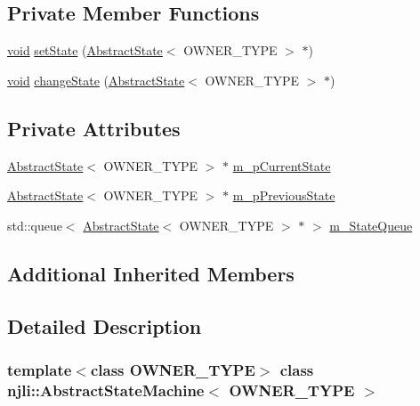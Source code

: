 \subsection*{Private Member Functions}
\begin{DoxyCompactItemize}
\item 
\mbox{\hyperlink{_thread_8h_af1e856da2e658414cb2456cb6f7ebc66}{void}} \mbox{\hyperlink{classnjli_1_1_abstract_state_machine_a6a399ba3abc4dbc2f5a0b6d23193c75e}{set\+State}} (\mbox{\hyperlink{classnjli_1_1_abstract_state}{Abstract\+State}}$<$ O\+W\+N\+E\+R\+\_\+\+T\+Y\+PE $>$ $\ast$)
\item 
\mbox{\hyperlink{_thread_8h_af1e856da2e658414cb2456cb6f7ebc66}{void}} \mbox{\hyperlink{classnjli_1_1_abstract_state_machine_a5133f8815d99e63c09179928e2c736b6}{change\+State}} (\mbox{\hyperlink{classnjli_1_1_abstract_state}{Abstract\+State}}$<$ O\+W\+N\+E\+R\+\_\+\+T\+Y\+PE $>$ $\ast$)
\end{DoxyCompactItemize}
\subsection*{Private Attributes}
\begin{DoxyCompactItemize}
\item 
\mbox{\hyperlink{classnjli_1_1_abstract_state}{Abstract\+State}}$<$ O\+W\+N\+E\+R\+\_\+\+T\+Y\+PE $>$ $\ast$ \mbox{\hyperlink{classnjli_1_1_abstract_state_machine_ae82332bd955b01fa48471ec0613e8207}{m\+\_\+p\+Current\+State}}
\item 
\mbox{\hyperlink{classnjli_1_1_abstract_state}{Abstract\+State}}$<$ O\+W\+N\+E\+R\+\_\+\+T\+Y\+PE $>$ $\ast$ \mbox{\hyperlink{classnjli_1_1_abstract_state_machine_a43a2c2c7a36aba24176e5d6d82ab9f45}{m\+\_\+p\+Previous\+State}}
\item 
std\+::queue$<$ \mbox{\hyperlink{classnjli_1_1_abstract_state}{Abstract\+State}}$<$ O\+W\+N\+E\+R\+\_\+\+T\+Y\+PE $>$ $\ast$ $>$ \mbox{\hyperlink{classnjli_1_1_abstract_state_machine_afc1c0619e024e807c01802979d5ef3db}{m\+\_\+\+State\+Queue}}
\end{DoxyCompactItemize}
\subsection*{Additional Inherited Members}


\subsection{Detailed Description}
\subsubsection*{template$<$class O\+W\+N\+E\+R\+\_\+\+T\+Y\+PE$>$\newline
class njli\+::\+Abstract\+State\+Machine$<$ O\+W\+N\+E\+R\+\_\+\+T\+Y\+P\+E $>$}

